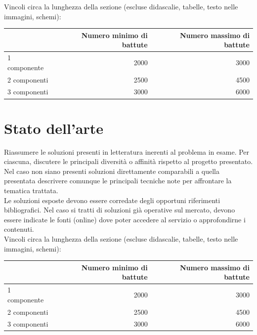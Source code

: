 \documentclass[12pt]{article}
\begin{document}
Vincoli circa la lunghezza della sezione (escluse didascalie, tabelle, testo nelle immagini, schemi):

\vspace{1cm}
\begin{tabular}{l|rr}
 & Numero minimo di battute & Numero massimo di battute \\
 \hline
 1 componente & 2000 & 3000 \\
 2 componenti & 2500 & 4500 \\
 3 componenti & 3000 & 6000 \\
 \hline
\end{tabular}


\newpage



\section{Stato dell'arte}

Riassumere le soluzioni presenti in letteratura inerenti al problema in esame. Per ciascuna, discutere le principali diversità o affinità rispetto al progetto presentato. Nel caso non siano presenti soluzioni direttamente comparabili a quella presentata descrivere comunque le principali tecniche note per affrontare la tematica trattata.\\

Le soluzioni esposte devono essere corredate degli opportuni riferimenti bibliografici. Nel caso si tratti di soluzioni già operative sul mercato, devono essere indicate le fonti (online) dove poter accedere al servizio o approfondirne i contenuti.\\


Vincoli circa la lunghezza della sezione (escluse didascalie, tabelle, testo nelle immagini, schemi):

\vspace{1cm}
\begin{tabular}{l|rr}
 & Numero minimo di battute & Numero massimo di battute \\
 \hline
 1 componente & 2000 & 3000 \\
 2 componenti & 2500 & 4500 \\
 3 componenti & 3000 & 6000 \\
 \hline
\end{tabular}
\end{document}
